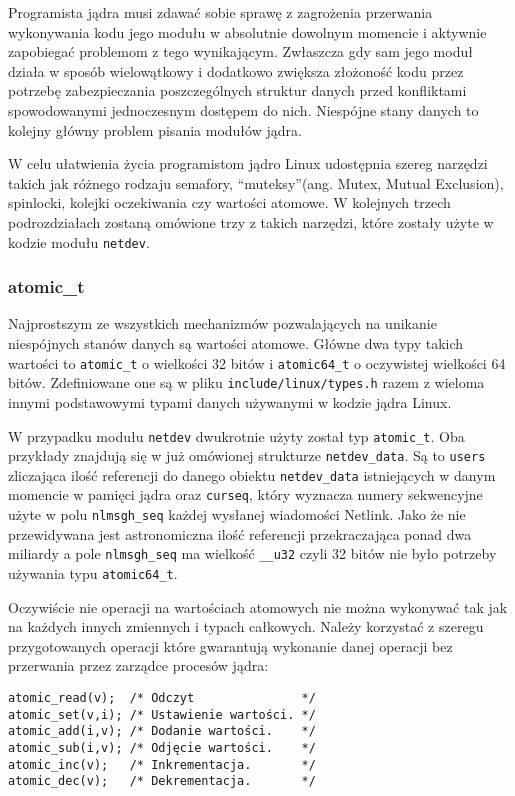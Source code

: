 \documentclass[10pt]{article}
\begin{document}
Programista jądra musi zdawać sobie sprawę z zagrożenia przerwania wykonywania kodu jego modułu w absolutnie dowolnym momencie i aktywnie zapobiegać problemom z tego wynikającym. Zwłaszcza gdy sam jego moduł działa w sposób wielowątkowy i dodatkowo zwiększa złożoność kodu przez potrzebę zabezpieczania poszczególnych struktur danych przed konfliktami spowodowanymi jednoczesnym dostępem do nich. Niespójne stany danych to kolejny główny problem pisania modułów jądra.

W celu ułatwienia życia programistom jądro Linux udostępnia szereg narzędzi takich jak różnego rodzaju semafory, ``muteksy''(ang. Mutex, Mutual Exclusion), spinlocki, kolejki oczekiwania czy wartości atomowe. W kolejnych trzech podrozdziałach zostaną omówione trzy z takich narzędzi, które zostały użyte w kodzie modułu \texttt{netdev}.

\subsubsection{atomic\_t}

Najprostszym ze wszystkich mechanizmów pozwalających na unikanie niespójnych stanów danych są wartości atomowe. Główne dwa typy takich wartości to \texttt{atomic\_t} o wielkości 32 bitów i \texttt{atomic64\_t} o oczywistej wielkości 64 bitów. Zdefiniowane one są w pliku \texttt{include/linux/types.h} razem z wieloma innymi podstawowymi typami danych używanymi w kodzie jądra Linux.

W przypadku modułu \texttt{netdev} dwukrotnie użyty został typ \texttt{atomic\_t}. Oba przykłady znajdują się w już omówionej strukturze \texttt{netdev\_data}. Są to \texttt{users} zliczająca ilość referencji do danego obiektu \texttt{netdev\_data} istniejących w danym momencie w pamięci jądra oraz \texttt{curseq}, który wyznacza numery sekwencyjne użyte w polu \texttt{nlmsgh\_seq} każdej wysłanej wiadomości Netlink. Jako że nie przewidywana jest astronomiczna ilość referencji przekraczająca ponad dwa miliardy a pole \texttt{nlmsgh\_seq} ma wielkość \texttt{\_\_u32} czyli 32 bitów nie było potrzeby używania typu \texttt{atomic64\_t}.

Oczywiście nie operacji na wartościach atomowych nie można wykonywać tak jak na każdych innych zmiennych i typach całkowych. Należy korzystać z szeregu przygotowanych operacji które gwarantują wykonanie danej operacji bez przerwania przez zarządce procesów jądra:

\begin{verbatim}
atomic_read(v);  /* Odczyt               */
atomic_set(v,i); /* Ustawienie wartości. */
atomic_add(i,v); /* Dodanie wartości.    */
atomic_sub(i,v); /* Odjęcie wartości.    */
atomic_inc(v);   /* Inkrementacja.       */
atomic_dec(v);   /* Dekrementacja.       */
\end{verbatim}
\end{document}

